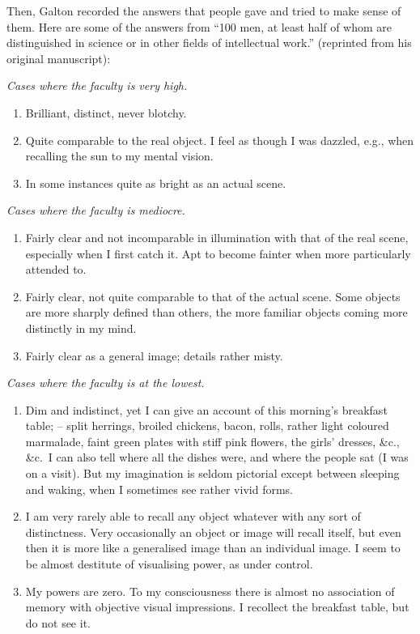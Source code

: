 \documentclass[
  oneside,
  12pt]{crumpbook}
\begin{document}
Then, Galton recorded the answers that people gave and tried to make sense of them. Here are some of the answers from ``100 men, at least half of whom are distinguished in science or in other fields of intellectual work.'' (reprinted from his original manuscript):

\emph{Cases where the faculty is very high.}

\begin{enumerate}
\def\labelenumi{\arabic{enumi}.}
\item
  Brilliant, distinct, never blotchy.
\item
  Quite comparable to the real object. I feel as though I was dazzled, e.g., when recalling the sun to my mental vision.
\item
  In some instances quite as bright as an actual scene.
\end{enumerate}

\emph{Cases where the faculty is mediocre.}

\begin{enumerate}
\def\labelenumi{\arabic{enumi}.}
\setcounter{enumi}{45}
\item
  Fairly clear and not incomparable in illumination with that of the real scene, especially when I first catch it. Apt to become fainter when more particularly attended to.
\item
  Fairly clear, not quite comparable to that of the actual scene. Some objects are more sharply defined than others, the more familiar objects coming more distinctly in my mind.
\item
  Fairly clear as a general image; details rather misty.
\end{enumerate}

\emph{Cases where the faculty is at the lowest.}

\begin{enumerate}
\def\labelenumi{\arabic{enumi}.}
\setcounter{enumi}{88}
\item
  Dim and indistinct, yet I can give an account of this morning's breakfast table; -- split herrings, broiled chickens, bacon, rolls, rather light coloured marmalade, faint green plates with stiff pink flowers, the girls' dresses, \&c., \&c.~I can also tell where all the dishes were, and where the people sat (I was on a visit). But my imagination is seldom pictorial except between sleeping and waking, when I sometimes see rather vivid forms.
\item
  I am very rarely able to recall any object whatever with any sort of distinctness. Very occasionally an object or image will recall itself, but even then it is more like a generalised image than an individual image. I seem to be almost destitute of visualising power, as under control.
\item
  My powers are zero. To my consciousness there is almost no association of memory with objective visual impressions. I recollect the breakfast table, but do not see it.
\end{enumerate}
\end{document}
